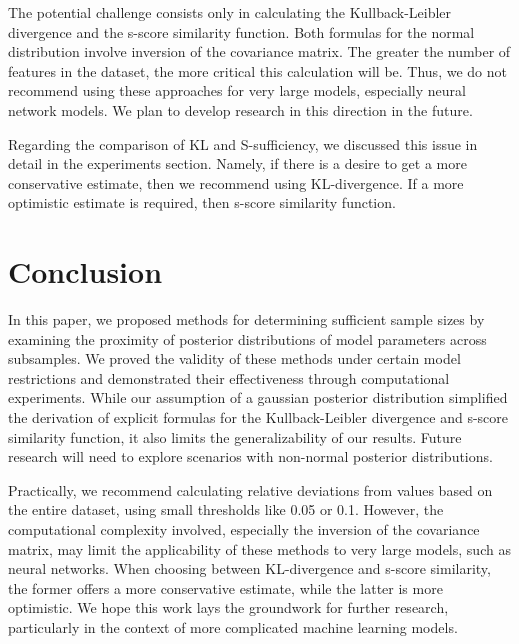 \documentclass[sn-mathphys-num]{sn-jnl}%
\begin{document}
The potential challenge consists only in calculating the Kullback-Leibler divergence and the s-score similarity function. Both formulas for the normal distribution involve inversion of the covariance matrix. The greater the number of features in the dataset, the more critical this calculation will be. Thus, we do not recommend using these approaches for very large models, especially neural network models. We plan to develop research in this direction in the future.

Regarding the comparison of KL and S-sufficiency, we discussed this issue in detail in the experiments section. Namely, if there is a desire to get a more conservative estimate, then we recommend using KL-divergence. If a more optimistic estimate is required, then s-score similarity function.

\section{Conclusion}

In this paper, we proposed methods for determining sufficient sample sizes by examining the proximity of posterior distributions of model parameters across subsamples. We proved the validity of these methods under certain model restrictions and demonstrated their effectiveness through computational experiments. While our assumption of a gaussian posterior distribution simplified the derivation of explicit formulas for the Kullback-Leibler divergence and s-score similarity function, it also limits the generalizability of our results. Future research will need to explore scenarios with non-normal posterior distributions.

Practically, we recommend calculating relative deviations from values based on the entire dataset, using small thresholds like 0.05 or 0.1. However, the computational complexity involved, especially the inversion of the covariance matrix, may limit the applicability of these methods to very large models, such as neural networks. When choosing between KL-divergence and s-score similarity, the former offers a more conservative estimate, while the latter is more optimistic. We hope this work lays the groundwork for further research, particularly in the context of more complicated machine learning models.
\end{document}
